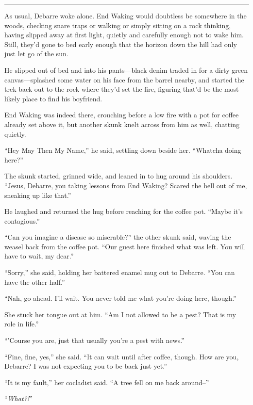 \begin{center}\rule{0.5\linewidth}{0.5pt}\end{center}

As usual, Debarre woke alone. End Waking would doubtless be somewhere in the woods, checking snare traps or walking or simply sitting on a rock thinking, having slipped away at first light, quietly and carefully enough not to wake him. Still, they'd gone to bed early enough that the horizon down the hill had only just let go of the sun.

He slipped out of bed and into his pants—black denim traded in for a dirty green canvas—splashed some water on his face from the barrel nearby, and started the trek back out to the rock where they'd set the fire, figuring that'd be the most likely place to find his boyfriend.

End Waking was indeed there, crouching before a low fire with a pot for coffee already set above it, but another skunk knelt across from him as well, chatting quietly.

``Hey May Then My Name,'' he said, settling down beside her. ``Whatcha doing here?''

The skunk started, grinned wide, and leaned in to hug around his shoulders. ``Jesus, Debarre, you taking lessons from End Waking? Scared the hell out of me, sneaking up like that.''

He laughed and returned the hug before reaching for the coffee pot. ``Maybe it's contagious.''

``Can you imagine a disease so miserable?'' the other skunk said, waving the weasel back from the coffee pot. ``Our guest here finished what was left. You will have to wait, my dear.''

``Sorry,'' she said, holding her battered enamel mug out to Debarre. ``You can have the other half.''

``Nah, go ahead. I'll wait. You never told me what you're doing here, though.''

She stuck her tongue out at him. ``Am I not allowed to be a pest? That is my role in life.''

``'Course you are, just that usually you're a pest with news.''

``Fine, fine, yes,'' she said. ``It can wait until after coffee, though. How are you, Debarre? I was not expecting you to be back just yet.''

``It is my fault,'' her cocladist said. ``A tree fell on me back around--''

``\emph{What?!}''


